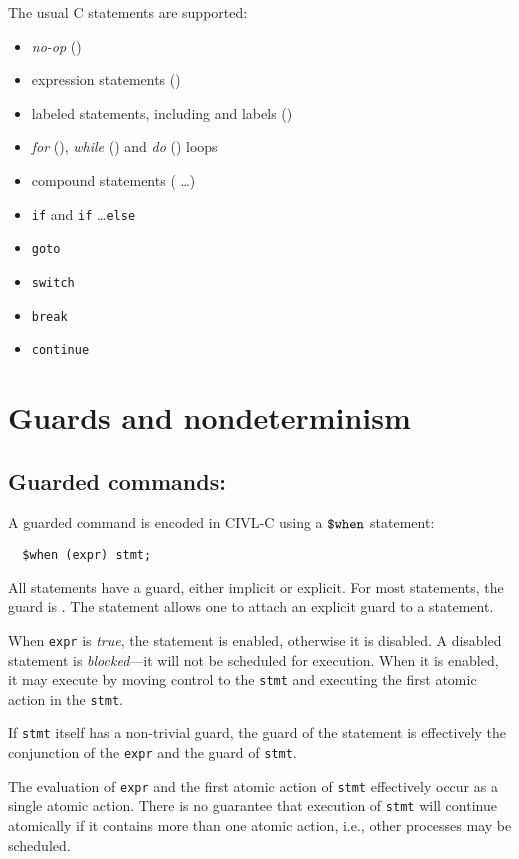 The usual C statements are supported:
\begin{itemize}
\item \emph{no-op} (\ct{;})
\item expression statements ()
\item labeled statements, including  and  labels
  ()
\item \emph{for} (), \emph{while} 
  () and \emph{do} ()
  loops
\item compound statements (\lb {} \ldots \rb)
\item \texttt{if} and \verb!if! \ldots \verb!else!
\item \verb!goto!
\item \verb!switch!
\item \verb!break!
\item \verb!continue!
\end{itemize}

\section{Guards and nondeterminism}

\subsection{Guarded commands: \cwhen}

A guarded command is encoded in CIVL-C using a $\mbox{\texttt{\${}when}}$ statement:
\begin{verbatim}
  $when (expr) stmt;
\end{verbatim}
All statements have a guard, either implicit or explicit.  For most
statements, the guard is \ctrue.  The \cwhen{} statement allows one to
attach an explicit guard to a statement.

When \texttt{expr} is \emph{true}, the statement is enabled, otherwise
it is disabled.  A disabled statement is \emph{blocked}---it will not
be scheduled for execution.  When it is enabled, it may execute by
moving control to the \texttt{stmt} and executing the first atomic
action in the \texttt{stmt}.

If \texttt{stmt} itself has a non-trivial guard, the guard of the
\cwhen{} statement is effectively the conjunction of the \texttt{expr}
and the guard of \texttt{stmt}.

The evaluation of \texttt{expr} and the first atomic action of
\texttt{stmt} effectively occur as a single atomic action.  There is
no guarantee that execution of \texttt{stmt} will continue atomically
if it contains more than one atomic action, i.e., other processes may
be scheduled.

